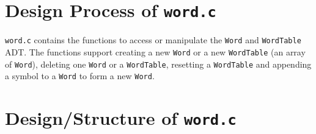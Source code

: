 \documentclass[12pt]{article}
\begin{document}
\section{Design Process of \texttt{word.c}}

\texttt{word.c} contains the functions to access or manipulate the \texttt{Word} and \texttt{WordTable} ADT. The functions support creating a new \texttt{Word} or a new \texttt{WordTable} (an array of \texttt{Word}), deleting one \texttt{Word} or a \texttt{WordTable}, resetting a \texttt{WordTable} and appending a symbol to a \texttt{Word} to form a new \texttt{Word}. \\

\section{Design/Structure of \texttt{word.c}}
\end{document}
